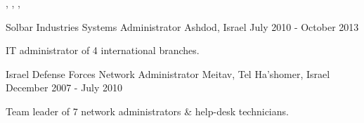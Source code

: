 \begin{cventries}
    \begin{cvskills}
       {, }
       {, , }
    \end{cvskills}
    
  \cventry
    {Solbar Industries}
    {Systems Administrator}
    {Ashdod, Israel}
    {July 2010 - October 2013}
    {
      \begin{cvitems}
        \item {IT administrator of 4 international branches.}
      \end{cvitems}
    }
    \vspace{3.0mm}

  \cventry
    {Israel Defense Forces}
    {Network Administrator}
    {Meitav, Tel Ha'shomer, Israel}
    {December 2007 - July 2010}
    {
      \begin{cvitems}
        \item {Team leader of 7 network administrators \& help-desk technicians.}
      \end{cvitems}
    }
    \vspace{2.0mm}

\end{cventries}

